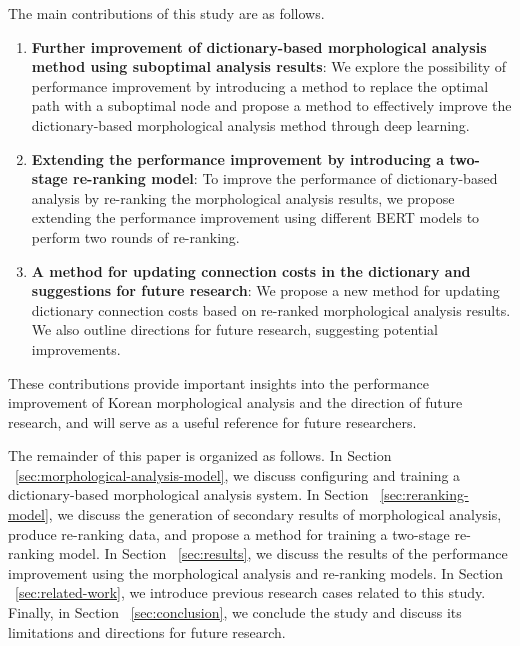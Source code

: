\documentclass[AMS,STIX2COL]{WileyNJD-v2}
\begin{document}
    The main contributions of this study are as follows.
    \begin{enumerate}
        \item \textbf{Further improvement of dictionary-based morphological analysis method using suboptimal analysis results}: We explore the possibility of performance improvement by introducing a method to replace the optimal path with a suboptimal node and propose a method to effectively improve the dictionary-based morphological analysis method through deep learning.
        \item \textbf{Extending the performance improvement by introducing a two-stage re-ranking model}: To improve the performance of dictionary-based analysis by re-ranking the morphological analysis results, we propose extending the performance improvement using different BERT models to perform two rounds of re-ranking.
        \item \textbf{A method for updating connection costs in the dictionary and suggestions for future research}: We propose a new method for updating dictionary connection costs based on re-ranked morphological analysis results. We also outline directions for future research, suggesting potential improvements.
    \end{enumerate}
    These contributions provide important insights into the performance improvement of Korean morphological analysis and the direction of future research, and will serve as a useful reference for future researchers.

    The remainder of this paper is organized as follows.
    In Section ~\ref{sec:morphological-analysis-model}, we discuss configuring and training a dictionary-based morphological analysis system.
    In Section ~\ref{sec:reranking-model}, we discuss the generation of secondary results of morphological analysis, produce re-ranking data, and propose a method for training a two-stage re-ranking model.
    In Section ~\ref{sec:results}, we discuss the results of the performance improvement using the morphological analysis and re-ranking models.
    In Section ~\ref{sec:related-work}, we introduce previous research cases related to this study.
    Finally, in Section ~\ref{sec:conclusion}, we conclude the study and discuss its limitations and directions for future research.
\end{document}
